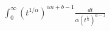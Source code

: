\documentclass[preview]{standalone}
\begin{document}
\begin{align*}
\int_{0}^{\infty} (t^{1/\alpha})^{\alpha n + b - 1} \frac{dt}{\alpha (t^{\frac{1}{\alpha}})^{\alpha - 1}}
\end{align*}
\end{document}
